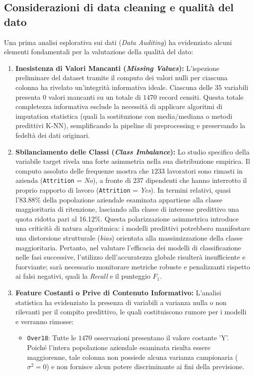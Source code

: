 \documentclass[11pt,a4paper]{article}
\begin{document}
\subsection{Considerazioni di data cleaning e qualità del dato}
Una prima analisi esplorativa sui dati (\textit{Data Auditing}) ha evidenziato alcuni elementi fondamentali per la valutazione della qualità del dato:
\begin{enumerate}
    \item \textbf{Inesistenza di Valori Mancanti (\textit{Missing Values}):} L'ispezione preliminare del dataset tramite il computo dei valori nulli per ciascuna colonna ha rivelato un'integrità informativa ideale. Ciascuna delle $35$ variabili presenta $0$ valori mancanti su un totale di $1470$ record censiti. Questa totale completezza informativa esclude la necessità di applicare algoritmi di imputation statistica (quali la sostituzione con media/mediana o metodi predittivi K-NN), semplificando la pipeline di preprocessing e preservando la fedeltà dei dati originari.
    \item \textbf{Sbilanciamento delle Classi (\textit{Class Imbalance}):} Lo studio specifico della variabile target rivela una forte asimmetria nella sua distribuzione empirica. Il computo assoluto delle frequenze mostra che $1233$ lavoratori sono rimasti in azienda (\texttt{Attrition} = \textit{No}), a fronte di $237$ dipendenti che hanno interrotto il proprio rapporto di lavoro (\texttt{Attrition} = \textit{Yes}). In termini relativi, quasi l'83.88\% della popolazione aziendale esaminata appartiene alla classe maggioritaria di ritenzione, lasciando alla classe di interesse predittivo una quota ridotta pari al 16.12\%. Questa polarizzazione asimmetrica introduce una criticità di natura algoritmica: i modelli predittivi potrebbero manifestare una distorsione strutturale (\textit{bias}) orientata alla massimizzazione della classe maggioritaria. Pertanto, nel valutare l'efficacia dei modelli di classificazione nelle fasi successive, l'utilizzo dell'accuratezza globale risulterà insufficiente e fuorviante; sarà necessario monitorare metriche robuste e penalizzanti rispetto ai falsi negativi, quali la \textit{Recall} e il punteggio $F_1$.
    \item \textbf{Feature Costanti o Prive di Contenuto Informativo:} L'analisi statistica ha evidenziato la presenza di variabili a varianza nulla o non rilevanti per il compito predittivo, le quali costituiscono rumore per i modelli e verranno rimosse:
    \begin{itemize}
        \item \texttt{Over18}: Tutte le $1470$ osservazioni presentano il valore costante 'Y'. Poiché l'intera popolazione aziendale esaminata risulta essere maggiorenne, tale colonna non possiede alcuna varianza campionaria ($\sigma^2 = 0$) e non fornisce alcun potere discriminante ai fini della previsione.

\end{itemize}
\end{enumerate}
\end{document}
